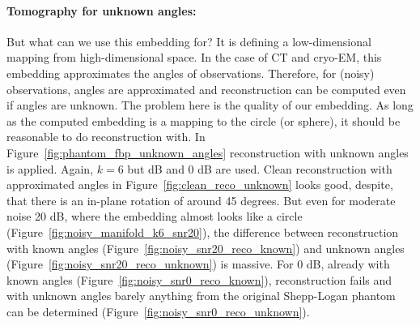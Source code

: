 \paragraph{Tomography for unknown angles:}
But what can we use this embedding for?
It is defining a low-dimensional mapping from high-dimensional space.
In the case of CT and cryo-EM, this embedding approximates the angles of observations.
Therefore, for (noisy) observations, angles are approximated and reconstruction can be computed even if angles are unknown.
The problem here is the quality of our embedding. As long as the computed embedding is a mapping to the circle (or sphere),
it should be reasonable to do reconstruction with.
In Figure~\ref{fig:phantom_fbp_unknown_angles} reconstruction with unknown angles is applied. Again, $k=6$
but  dB and 0 dB are used. Clean reconstruction with approximated angles in Figure~\ref{fig:clean_reco_unknown} looks good, 
despite, that there is an in-plane rotation of around 45 degrees. 
But even for moderate noise 20 dB, where the embedding almost looks like a circle (Figure~\ref{fig:noisy_manifold_k6_snr20}),
the difference between reconstruction with known angles (Figure~\ref{fig:noisy_snr20_reco_known})
and unknown angles (Figure~\ref{fig:noisy_snr20_reco_unknown}) is massive.
For 0 dB, already with known angles (Figure~\ref{fig:noisy_snr0_reco_known}), reconstruction fails and with unknown angles barely anything from
the original Shepp-Logan phantom can be determined  (Figure~\ref{fig:noisy_snr0_reco_unknown}).

